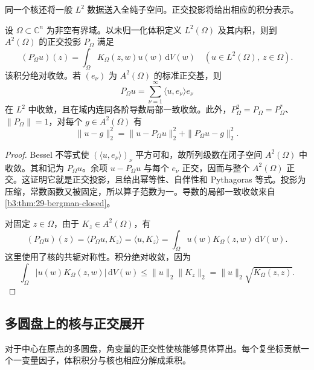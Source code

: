 同一个核还将一般 \(L^2\) 数据送入全纯子空间。正交投影将给出相应的积分表示。

\begin{theorem}[Bergman 投影]\label{b3:thm:29-bergman-projection}
设 \(\Omega\subset\mathbb C^n\) 为非空有界域。以未归一化体积定义 \(L^2(\Omega)\) 及其内积，则到 \(A^2(\Omega)\) 的正交投影 \(P_\Omega\) 满足
\begin{equation}\label{b3:eq:29-bergman-projection}
 (P_\Omega u)(z)=\int_\Omega K_\Omega(z,w)u(w)\,\mathrm{d}V(w)
 \quad(u\in L^2(\Omega),\ z\in\Omega).
\end{equation}
该积分绝对收敛。若 \((e_\nu)\) 为 \(A^2(\Omega)\) 的标准正交基，则
\[
 P_\Omega u=\sum_{\nu=1}^\infty\langle u,e_\nu\rangle e_\nu
\]
在 \(L^2\) 中收敛，且在域内连同各阶导数局部一致收敛。此外，\(P_\Omega^2=P_\Omega=P_\Omega^*\)、\(\|P_\Omega\|=1\)，对每个 \(g\in A^2(\Omega)\) 有
\[
 \|u-g\|_2^2=\|u-P_\Omega u\|_2^2+\|P_\Omega u-g\|_2^2.
\]
\end{theorem}
\begin{proof}
Bessel 不等式使 \((\langle u,e_\nu\rangle)_\nu\) 平方可和，故所列级数在闭子空间 \(A^2(\Omega)\) 中收敛。其和记为 \(P_\Omega u\)。余项 \(u-P_\Omega u\) 与每个 \(e_\nu\) 正交，因而与整个 \(A^2(\Omega)\) 正交。这证明它就是正交投影，且给出幂等性、自伴性和 Pythagoras 等式。投影为压缩，常数函数又被固定，所以算子范数为一。导数的局部一致收敛来自\cref{b3:thm:29-bergman-closed}。

对固定 \(z\in\Omega\)，由于 \(K_z\in A^2(\Omega)\)，有
\[
 (P_\Omega u)(z)=\langle P_\Omega u,K_z\rangle
 =\langle u,K_z\rangle
 =\int_\Omega u(w)K_\Omega(z,w)\,\mathrm{d}V(w).
\]
这里使用了核的共轭对称性。积分绝对收敛，因为
\[
 \int_\Omega|u(w)K_\Omega(z,w)|\,\mathrm{d}V(w)
 \le\|u\|_2\|K_z\|_2
 =\|u\|_2\sqrt{K_\Omega(z,z)}.
\]
\end{proof}

\subsection{多圆盘上的核与正交展开}
\label{b3:subsec:290604}

对于中心在原点的多圆盘，角变量的正交性使核能够具体算出。每个复坐标贡献一个一变量因子，体积积分与核也相应分解成乘积。

